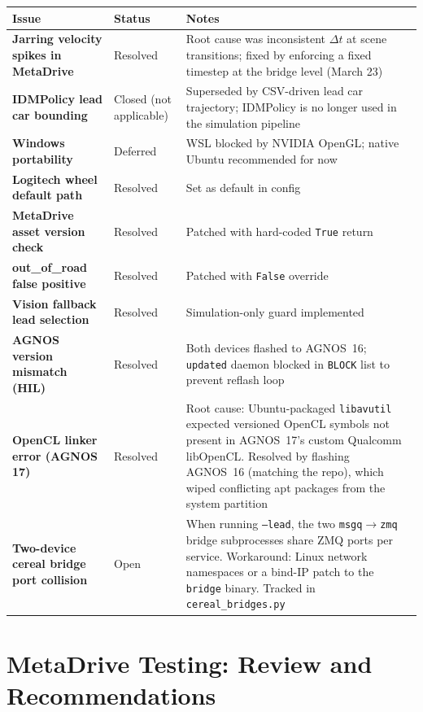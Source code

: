 \documentclass[12pt]{article}
\begin{document}
\begin{center}
\begin{tabular}{>{\bfseries}p{4cm} p{4cm} p{4.5cm}}
  \toprule
  Issue & Status & Notes \\
  \midrule
  Jarring velocity spikes in MetaDrive & Resolved & Root cause was inconsistent $\Delta t$ at scene transitions; fixed by enforcing a fixed timestep at the bridge level (March 23) \\
  IDMPolicy lead car bounding & Closed (not applicable) & Superseded by CSV-driven lead car trajectory; IDMPolicy is no longer used in the simulation pipeline \\
  Windows portability & Deferred & WSL blocked by NVIDIA OpenGL; native Ubuntu recommended for now \\
  Logitech wheel default path & Resolved & Set as default in config \\
  MetaDrive asset version check & Resolved & Patched with hard-coded \texttt{True} return \\
  out\_of\_road false positive & Resolved & Patched with \texttt{False} override \\
  Vision fallback lead selection & Resolved & Simulation-only guard implemented \\
  AGNOS version mismatch (HIL) & Resolved & Both devices flashed to AGNOS~16; \texttt{updated} daemon blocked in \texttt{BLOCK} list to prevent reflash loop \\
  OpenCL linker error (AGNOS 17) & Resolved & Root cause: Ubuntu-packaged \texttt{libavutil} expected versioned OpenCL symbols not present in AGNOS~17's custom Qualcomm libOpenCL. Resolved by flashing AGNOS~16 (matching the repo), which wiped conflicting apt packages from the system partition \\
  Two-device cereal bridge port collision & Open & When running \texttt{--lead}, the two \texttt{msgq$\to$zmq} bridge subprocesses share ZMQ ports per service. Workaround: Linux network namespaces or a bind-IP patch to the \texttt{bridge} binary. Tracked in \texttt{cereal\_bridges.py} \\
  \bottomrule
\end{tabular}
\end{center}

\section{MetaDrive Testing: Review and Recommendations}
\end{document}
